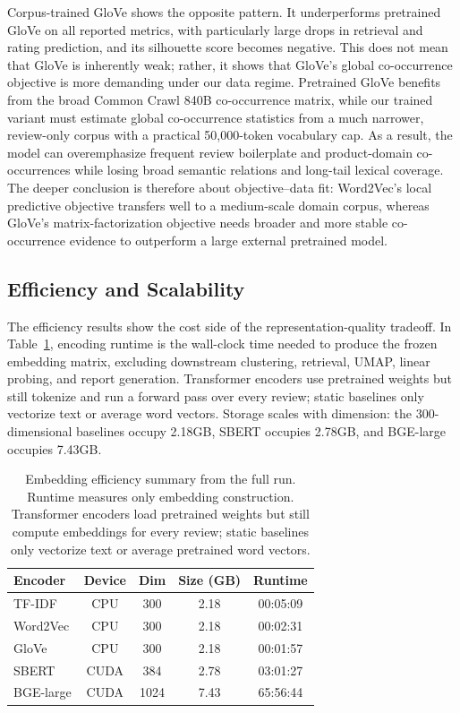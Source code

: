 \documentclass{article}
\begin{document}
Corpus-trained GloVe shows the opposite pattern. It underperforms pretrained GloVe on all reported metrics, with particularly large drops in retrieval and rating prediction, and its silhouette score becomes negative. This does not mean that GloVe is inherently weak; rather, it shows that GloVe's global co-occurrence objective is more demanding under our data regime. Pretrained GloVe benefits from the broad Common Crawl 840B co-occurrence matrix, while our trained variant must estimate global co-occurrence statistics from a much narrower, review-only corpus with a practical 50,000-token vocabulary cap. As a result, the model can overemphasize frequent review boilerplate and product-domain co-occurrences while losing broad semantic relations and long-tail lexical coverage. The deeper conclusion is therefore about objective--data fit: Word2Vec's local predictive objective transfers well to a medium-scale domain corpus, whereas GloVe's matrix-factorization objective needs broader and more stable co-occurrence evidence to outperform a large external pretrained model.

\subsection{Efficiency and Scalability}

The efficiency results show the cost side of the representation-quality tradeoff. In Table~\ref{tab:efficiency-results}, encoding runtime is the wall-clock time needed to produce the frozen embedding matrix, excluding downstream clustering, retrieval, UMAP, linear probing, and report generation. Transformer encoders use pretrained weights but still tokenize and run a forward pass over every review; static baselines only vectorize text or average word vectors. Storage scales with dimension: the 300-dimensional baselines occupy 2.18GB, SBERT occupies 2.78GB, and BGE-large occupies 7.43GB.

\begin{table}[H]
\centering
\footnotesize
\setlength{\tabcolsep}{3pt}
\renewcommand{\arraystretch}{1.02}
\begin{tabular*}{\columnwidth}{@{\extracolsep{\fill}}lcccc@{}}
\toprule
Encoder & Device & Dim & Size (GB) & Runtime \\
\midrule
TF-IDF & CPU & 300 & 2.18 & 00:05:09 \\
Word2Vec & CPU & 300 & 2.18 & 00:02:31 \\
GloVe & CPU & 300 & 2.18 & 00:01:57 \\
SBERT & CUDA & 384 & 2.78 & 03:01:27 \\
BGE-large & CUDA & 1024 & 7.43 & 65:56:44 \\
\bottomrule
\end{tabular*}
\caption{Embedding efficiency summary from the full run. Runtime measures only embedding construction. Transformer encoders load pretrained weights but still compute embeddings for every review; static baselines only vectorize text or average pretrained word vectors.}
\label{tab:efficiency-results}
\end{table}
\end{document}
